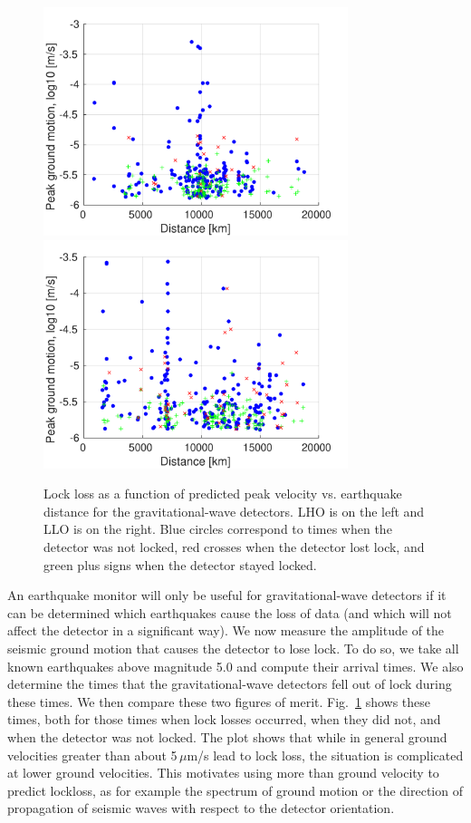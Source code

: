 \documentclass[twocolumn, prl, superscriptaddress]{revtex4}
\begin{document}
\begin{figure}[t]
\hspace*{-0.5cm}
 \includegraphics[width=3.5in]{lockloss_vel_distance_LHO.pdf}
  \includegraphics[width=3.5in]{lockloss_vel_distance_LLO.pdf}
 \caption{Lock loss as a function of predicted peak velocity vs. earthquake distance for the gravitational-wave detectors. LHO is on the left and LLO is on the right. Blue circles correspond to times when the detector was not locked, red crosses when the detector lost lock, and green plus signs when the detector stayed locked.}
 \label{fig:lockloss}
\end{figure}

An earthquake monitor will only be useful for gravitational-wave detectors if it can be determined which earthquakes cause the loss of data (and which will not affect the detector in a significant way).
We now measure the amplitude of the seismic ground motion that causes the detector to lose lock. To do so, we take all known earthquakes above magnitude 5.0 and compute their arrival times. 
We also determine the times that the gravitational-wave detectors fell out of lock during these times. 
We then compare these two figures of merit. 
Fig.~\ref{fig:lockloss} shows these times, both for those times when lock losses occurred, when they did not, and when the detector was not locked. 
The plot shows that while in general ground velocities greater than about 5\,$\mu$m/s lead to lock loss, the situation is complicated at lower ground velocities. This motivates using more than ground velocity to predict lockloss, as for example the spectrum of ground motion or the direction of propagation of seismic waves with respect to the detector orientation.
\end{document}
